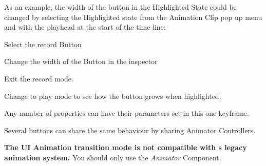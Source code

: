 As an example, the width of the button in the Highlighted State could be changed by selecting the Highlighted state from the Animation Clip pop up menu and with the playhead at the start of the time line\+:


\begin{DoxyItemize}
\item Select the record Button
\item Change the width of the Button in the inspector
\item Exit the record mode.
\end{DoxyItemize}

Change to play mode to see how the button grows when highlighted.

Any number of properties can have their parameters set in this one keyframe.

Several buttons can share the same behaviour by sharing Animator Controllers.

{\bfseries{The UI Animation transition mode is not compatible with \textquotesingle{}s legacy animation system.}} You should only use the {\itshape Animator} Component. 